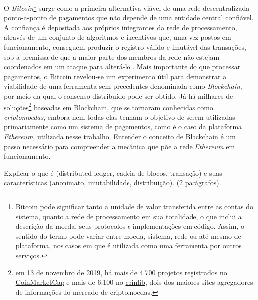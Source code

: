 \documentclass[a4paper,11pt]{article}
\begin{document}
O \emph{Bitcoin}\footnote{Bitcoin pode significar tanto a unidade de valor transferida entre as contas do sistema, quanto a rede de processamento em sua totalidade, o que inclui a descrição da moeda, seus protocolos e implementações em código.
Assim, o sentido do termo pode variar entre moeda, sistema, rede ou até mesmo de plataforma, nos casos em que é utilizada como uma ferramenta por outros serviços.} surge como a primeira alternativa viável de uma rede descentralizada ponto-a-ponto de pagamentos que não depende de uma entidade central confiável.
A confiança é depositada aos próprios integrantes da rede de processamento, através de um conjunto de algoritmos e incentivos que, uma vez postos em funcionamento, conseguem produzir o registro válido e imutável das transações, sob a premissa de que a maior parte dos membros da rede não estejam coordenados em um ataque para alterá-lo \cite{nakamoto2008bitcoin}.
Mais importante do que processar pagamentos, o Bitcoin revelou-se um experimento útil para demonstrar a viabilidade de uma ferramenta sem precedentes denominada como \emph{Blockchain}, por meio da qual o consenso distribuído pode ser obtido.
Já há milhares de soluções\footnote{em 13 de novembro de 2019, há mais de 4.700 projetos registrados no \href{https://coinmarketcap.com/}{CoinMarketCap} e mais de 6.100 no \href{https://coinlib.io/}{coinlib}, dois dos maiores sites agregadores de informações do mercado de criptomoedas.} baseadas em Blockchain, que se tornaram conhecidas como \emph{criptomoedas}, embora nem todas elas tenham o objetivo de serem utilizadas primariamente como um sistema de pagamentos, como é o caso da plataforma \emph{Ethereum}, utilizada nesse trabalho. 
Entender o conceito de Blockchain é um passo necessário para compreender a mecânica que põe a rede \emph{Ethereum} em funcionamento.

{\color{ForestGreen}Explicar o que é (distributed ledger, cadeia de blocos, transação) e suas características (anonimato, imutabilidade, distribuição). (2 parágrafos).} 
\end{document}
